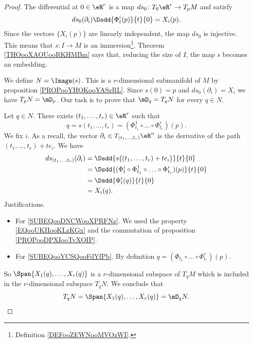 \begin{proof}
	The differential at \( 0\in \eR^r\) is a map \( ds_0\colon T_0\eR^r\to T_pM\) and satisfy
	\begin{equation}
		ds_0(\partial_i)\Dsdd{ \Phi_t^i(p) }{t}{0}=X_i(p).
	\end{equation}
	Since the vectors \( \{ X_i(p) \}\) are linearly independent, the map \( ds_0\) is injective. This means that \( s\colon I\to M\) is an immersion\footnote{Definition \ref{DEFooZEWNooMVOzWI}.}. Theorem \ref{THOooXAOUooRKHMBm} says that, reducing the size of \( I\), the map \( s\) becomes an embedding.

	We define \( N=\Image(s)\). This is a \( r\)-dimensional submanifold of \( M\) by proposition \ref{PROPooYHOKooYASzRL}. Since \( s(0)=p\) and \( ds_0(\partial_i)=X_i\) we have \( T_pN=\mD_p\). Our task is to prove that \( \mD_q=T_qN\) for every \( q\in N\).

	Let \( q\in N\). There exists \( (t_1,\ldots, t_r)\in \eR^r\) such that
	\begin{equation}
		q=s(t_1,\ldots, t_r)=(\Phi_{t_1}^1\circ \ldots\circ\Phi_{t_r}^r)(p).
	\end{equation}
	We fix \( i\). As a recall, the vector \( \partial_i\in T_{(t_1,\ldots, t_r)}\eR^n\) is the derivative of the path \( (t_1,\ldots, t_r)+te_i\). We have
	\begin{subequations}
		\begin{align}
			ds_{(t_1,\ldots, t_r)}(\partial_i) & =\Dsdd{ s\big( (t_1,\ldots, t_r)+te_i \big) }{t}{0}                                                           \\
			                                   & =\Dsdd{ (\Phi_t^i\circ\Phi_{t_1}^1\circ\ldots\circ\Phi_{t_r}^r)(p)    }{t}{0}     \label{SUBEQooDNCWooXPRFNz} \\
			                                   & =\Dsdd{ \Phi_t^i(q) }{t}{0}        \label{SUBEQooYCSQooFdYfPb}                                                \\
			                                   & =X_i(q).
		\end{align}
	\end{subequations}
	Justifications.
	\begin{itemize}
		\item For \eqref{SUBEQooDNCWooXPRFNz}. We used the property \eqref{EQooUKIIooKLzKGx} and the commutation of proposition \ref{PROPooDPXIooTvXOIP}.
		\item For \eqref{SUBEQooYCSQooFdYfPb}. By definition \( q=(\Phi_{t_1}\circ\ldots\circ\Phi_{t_r}^r)(p)\).
	\end{itemize}
	So \( \Span\{ X_1(q),\ldots, X_r(q) \}\) is a \( r\)-dimensional subspace of \( T_qM\) which is included in the \( r\)-dimensional subspace \( T_qN\). We conclude that
	\begin{equation}
		T_qN=\Span\{ X_1(q),\ldots, X_r(q) \}=\mD_qN.
	\end{equation}
\end{proof}


